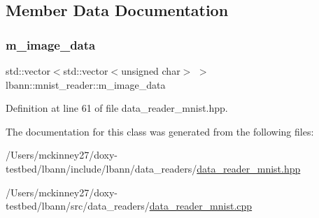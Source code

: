 \subsection{Member Data Documentation}
\mbox{\label{classlbann_1_1mnist__reader_a566ec18b29037abafe472b371f86aaca}} 
\subsubsection{\texorpdfstring{m\+\_\+image\+\_\+data}{m\_image\_data}}
{\footnotesize\ttfamily std\+::vector$<$std\+::vector$<$unsigned char$>$ $>$ lbann\+::mnist\+\_\+reader\+::m\+\_\+image\+\_\+data\hspace{0.3cm}{\ttfamily [protected]}}



Definition at line 61 of file data\+\_\+reader\+\_\+mnist.\+hpp.



The documentation for this class was generated from the following files\+:\begin{DoxyCompactItemize}
\item 
/\+Users/mckinney27/doxy-\/testbed/lbann/include/lbann/data\+\_\+readers/\hyperlink{data__reader__mnist_8hpp}{data\+\_\+reader\+\_\+mnist.\+hpp}\item 
/\+Users/mckinney27/doxy-\/testbed/lbann/src/data\+\_\+readers/\hyperlink{data__reader__mnist_8cpp}{data\+\_\+reader\+\_\+mnist.\+cpp}\end{DoxyCompactItemize}
